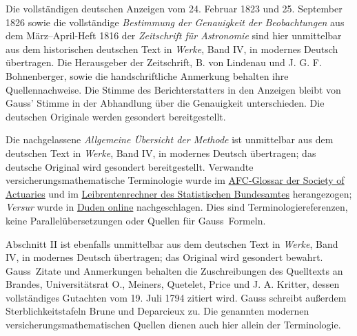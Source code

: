 Die vollständigen deutschen Anzeigen vom 24. Februar 1823 und 25. September 1826 sowie die vollständige \textit{Bestimmung der Genauigkeit der Beobachtungen} aus dem März--April-Heft 1816 der \textit{Zeitschrift für Astronomie} sind hier unmittelbar aus dem historischen deutschen Text in \textit{Werke}, Band IV, in modernes Deutsch übertragen. Die Herausgeber der Zeitschrift, B. von Lindenau und J. G. F. Bohnenberger, sowie die handschriftliche Anmerkung behalten ihre Quellennachweise. Die Stimme des Berichterstatters in den Anzeigen bleibt von Gauss’ Stimme in der Abhandlung über die Genauigkeit unterschieden. Die deutschen Originale werden gesondert bereitgestellt.\par\medskip\noindent Die nachgelassene \textit{Allgemeine Übersicht der Methode} ist unmittelbar aus dem deutschen Text in \textit{Werke}, Band IV, in modernes Deutsch übertragen; das deutsche Original wird gesondert bereitgestellt. Verwandte versicherungsmathematische Terminologie wurde im \href{https://afc.soa.org/}{AFC-Glossar der Society of Actuaries} und im \href{https://service.destatis.de/DE/leibrentenrechner/}{Leibrentenrechner des Statistischen Bundesamtes} herangezogen; \textit{Versur} wurde in \href{https://www.duden.de/rechtschreibung/Versur}{Duden online} nachgeschlagen. Dies sind Terminologiereferenzen, keine Parallelübersetzungen oder Quellen für Gauss\textquotesingle\ Formeln.\par\medskip\noindent Abschnitt II ist ebenfalls unmittelbar aus dem deutschen Text in \textit{Werke}, Band IV, in modernes Deutsch übertragen; das Original wird gesondert bewahrt. Gauss\textquotesingle\ Zitate und Anmerkungen behalten die Zuschreibungen des Quelltexts an Brandes, Universitätsrat O., Meiners, Quetelet, Price und J. A. Kritter, dessen vollständiges Gutachten vom 19. Juli 1794 zitiert wird. Gauss schreibt außerdem Sterblichkeitstafeln Brune und Deparcieux zu. Die genannten modernen versicherungsmathematischen Quellen dienen auch hier allein der Terminologie.
